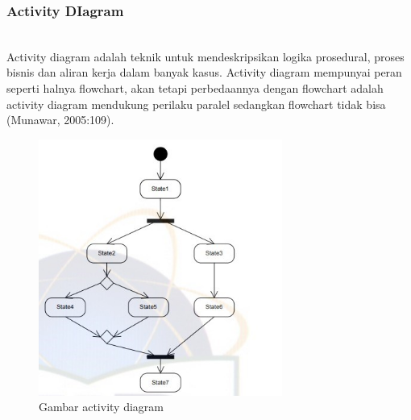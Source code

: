 \subsubsection{Activity DIagram}
\hfill\\
Activity diagram adalah teknik untuk mendeskripsikan logika prosedural, proses bisnis dan aliran kerja dalam banyak kasus. Activity diagram mempunyai peran seperti halnya flowchart, akan tetapi perbedaannya dengan flowchart adalah activity diagram mendukung perilaku paralel sedangkan flowchart tidak bisa (Munawar, 2005:109).
	\begin{figure}[H]
		\includegraphics[width=8cm]{figures/activity.jpg}
		\centering
		\caption{Gambar activity diagram}
	\end{figure}
	
